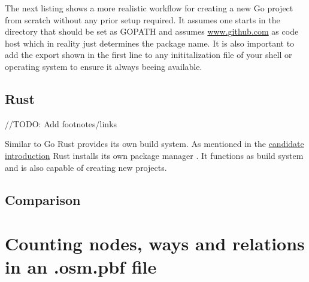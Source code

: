 The next listing shows a more realistic workflow for creating a new Go project from scratch without any prior setup required. It assumes one starts in the directory that should be set as GOPATH and assumes \url{www.github.com} as code host which in reality just determines the package name. It is also important to add the export shown in the first line to any inititalization file of your shell or operating system to ensure it always beeing available.
\\



\subsection{Rust}
\label{subsec:Implementation::Setup::Rust}

//TODO: Add footnotes/links

Similar to Go Rust provides its own build system. As mentioned in the \hyperref[subsec:State_of_the_art::Candidates::Rust]{candidate introduction} Rust installs its own package manager . It functions as build system and is also capable of creating new projects.
\\



\subsection{Comparison}
\label{subsec:Implementation::Setup::Comparison}

\section{Counting nodes, ways and relations in an .osm.pbf file}
\label{sec:Implementation::Counting}

